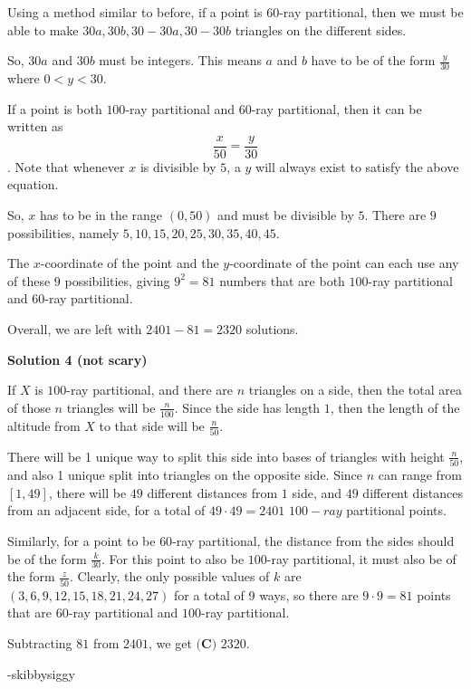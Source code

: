 \begin{enumerate}
 Using a method similar to before, if a point is $60$-ray partitional, then we must be able to make $30a, 30b, 30 - 30a, 30 -30b$ triangles on the different sides. 

 So, $30a$ and $30b$ must be integers. This means $a$ and $b$ have to be of the form $\frac{y}{30}$ where $0<y<30.$

 If a point is both $100$-ray partitional and $60$-ray partitional, then it can be written as 
 \[\frac{x}{50} =  \frac{y}{30}\]. Note that whenever $x$ is divisible by $5$, a $y$ will always exist to satisfy the above equation.

 So, $x$ has to be in the range $(0, 50)$ and must be divisible by $5$. There are $9$ possibilities, namely $5, 10, 15, 20, 25, 30, 35, 40, 45.$ 

 The $x$-coordinate of the point and the $y$-coordinate of the point can each use any of these $9$ possibilities, giving $9^2 = 81$ numbers that are both $100$-ray partitional and $60$-ray partitional.

 Overall, we are left with $2401 - 81 = \boxed{2320}$ solutions.

 



\textbf{Solution 4 (not scary)}

If $X$ is $100$-ray partitional, and there are $n$ triangles on a side, then the total area of those $n$ triangles will be $\frac{n}{100}$. Since the side has length $1$, then the length of the altitude from $X$ to that side will be $\frac{n}{50}$.

 
There will be 1 unique way to split this side into bases of triangles with height $\frac{n}{50}$, and also 1 unique split into triangles on the opposite side. Since $n$ can range from $[1,49]$, there will be $49$ different distances from $1$ side, and $49$ different distances from an adjacent side, for a total of $49\cdot 49 = 2401$ $100-ray$ partitional points. 

 
Similarly, for a point to be $60$-ray partitional, the distance from the sides should be of the form $\frac{k}{30}$. For this point to also be $100$-ray partitional, it must also be of the form $\frac{z}{50}$. Clearly, the only possible values of $k$ are $(3,6,9,12,15,18,21,24,27)$ for a total of 9 ways, so there are $9\cdot 9 = 81$ points that are $60$-ray partitional and $100$-ray partitional.

 
Subtracting $81$ from $2401$, we get $\boxed{\textbf{(C) } 2320}$. 

 -skibbysiggy


\end{enumerate}
